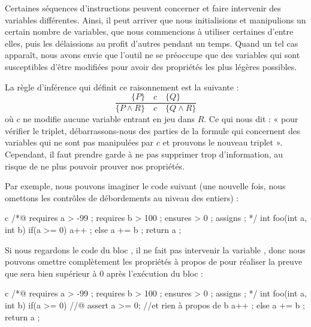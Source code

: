 \label{l3:statements-basic-constancy}


Certaines séquences d'instructions peuvent concerner et faire intervenir des
variables différentes. Ainsi, il peut arriver que nous initialisions et manipulions
un certain nombre de variables, que nous commencions à utiliser certaines d'entre
elles, puis les délaissions au profit d'autres pendant un temps. Quand un
tel cas apparaît, nous avons envie que l'outil ne se préoccupe que des variables
qui sont susceptibles d'être modifiées pour avoir des propriétés les plus légères
possibles.



La règle d'inférence qui définit ce raisonnement est la suivante :
$$\dfrac{\{P\}\quad c\quad \{Q\}}{\{P \wedge R\}\quad c\quad \{Q \wedge R\}}$$
où $c$ ne modifie aucune variable entrant en jeu dans $R$. Ce qui nous dit : « pour
vérifier le triplet, débarrassons-nous des parties de la formule qui concernent des
variables qui ne sont pas manipulées par $c$ et prouvons le nouveau triplet ».
Cependant, il faut prendre garde à ne pas supprimer trop d'information, au risque
de ne plus pouvoir prouver nos propriétés.



Par exemple, nous pouvons imaginer le code suivant (une nouvelle fois, nous omettons
les contrôles de débordements au niveau des entiers) :



\begin{CodeBlock}{c}
/*@
  requires a > -99 ;
  requires b > 100 ;
  ensures  \result > 0 ;
  assigns  \nothing ;
*/
int foo(int a, int b){
  if(a >= 0){
    a++ ;
  } else {
    a += b ;
  }
  return a ;
}
\end{CodeBlock}



Si nous regardons le code du bloc , il ne fait pas intervenir la variable
, donc nous pouvons omettre complètement les propriétés à propos de   pour
réaliser la preuve que  sera bien supérieur à 0 après l'exécution du bloc :



\begin{CodeBlock}{c}
/*@
  requires a > -99 ;
  requires b > 100 ;
  ensures  \result > 0 ;
  assigns  \nothing ;
*/
int foo(int a, int b){
  if(a >= 0){
    //@ assert a >= 0; //et rien à propos de b
    a++ ;
  } else {
    a += b ;
  }
  return a ;
}
\end{CodeBlock}



